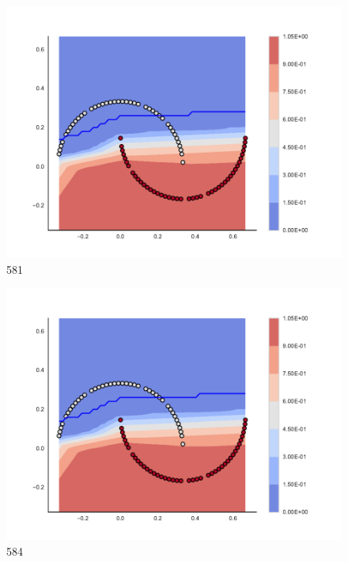 \begin{subfigure}[b]{0.09\textwidth}
    \includegraphics[clip, trim=2.35cm 1.75cm 4.5cm 0cm,width=\textwidth]{img/convergence/581.pdf}
    \caption{581}
    \label{fig:convergence_581}
\end{subfigure}
%
\begin{subfigure}[b]{0.09\textwidth}
    \includegraphics[clip, trim=2.35cm 1.75cm 4.5cm 0cm,width=\textwidth]{img/convergence/584.pdf}
    \caption{584}
    \label{fig:convergence_584}
\end{subfigure}
%
